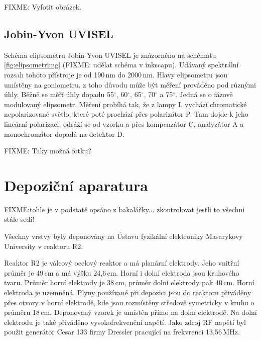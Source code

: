 FIXME: Vyfotit obrázek.


\subsection{Jobin-Yvon UVISEL}
Schéma elipsometru Jobin-Yvon UVISEL je znázorněno na schématu \ref{fig:elipsometrimg} (FIXME: udělat schéma v inkscapu). Udávaný spektrální rozsah tohoto přístroje je od 190\,nm do 2000\,nm. Hlavy elipsometru jsou umístěny na goniometru, z toho důvodu může být měření prováděno pod různými úhly. Běžně se měří úhly dopadu 55$^\circ$, 60$^\circ$, 65$^\circ$, 70$^\circ$ a 75$^\circ$. Jedná se o fázově modulovaný elipsometr. Měření probíhá tak, že z lampy L vychází chromatické nepolarizované světlo, které poté prochází přes polarizátor P. Tam dojde k jeho lineární polarizaci, odráží se od vzorku a přes kompenzátor C, analyzátor A a monochromátor dopadá na detektor D.

FIXME: Taky možná fotku?


\section{Depoziční aparatura}
FIXME:tohle je v podstatě opsáno z bakalářky... zkontrolovat jestli to všechni stále sedí!

Všechny vrstvy byly deponovány na Ústavu fyzikální elektroniky Masarykovy University v reaktoru R2. 

Reaktor R2 je válcový ocelový reaktor a má planární elektrody. Jeho vnitřní průměr je 49\,cm a má výšku 24,6\,cm. Horní i dolní elektroda jsou kruhového tvaru. Průměr horní elektrody je 38\,cm, průměr dolní elektrody pak 40\,cm. Horní elektroda je uzemněná. Plyny používané při depozici jsou do reaktoru přiváděny přes otvory v horní elektrodě, kde jsou rozmístěny středově symetricky v kru\-hu o průměru 18\,cm. Deponovaný vzorek je umístěn přímo na dolní elektrodě. Na dolní elektrodu je také přiváděno vysokofrekvenční napětí. Jako zdroj RF napětí byl použit generátor Cesar 133 firmy Dressler pracující na frekvrenci 13,56\,MHz.

